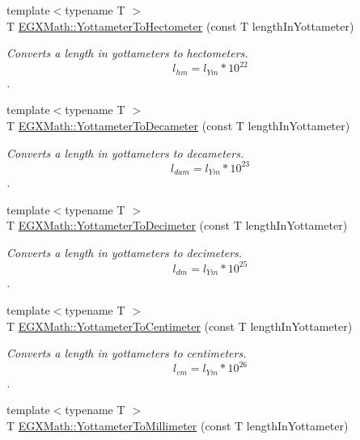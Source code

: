 \begin{DoxyCompactItemize}
{\footnotesize template$<$typename T $>$ }\\T \mbox{\hyperlink{group___e_g_x_math-_conversions-_length_conversions-_yottameter-_s_i_ga3c7aed6e299bc4f0288d0672a7262320}{E\+G\+X\+Math\+::\+Yottameter\+To\+Hectometer}} (const T length\+In\+Yottameter)
\begin{DoxyCompactList}\small\item\em Converts a length in yottameters to hectometers. \[ l_{hm}=l_{Ym} * 10^{22} \]. \end{DoxyCompactList}\item 
{\footnotesize template$<$typename T $>$ }\\T \mbox{\hyperlink{group___e_g_x_math-_conversions-_length_conversions-_yottameter-_s_i_gadb4ab7fb7c1091124160d66ace6439a3}{E\+G\+X\+Math\+::\+Yottameter\+To\+Decameter}} (const T length\+In\+Yottameter)
\begin{DoxyCompactList}\small\item\em Converts a length in yottameters to decameters. \[ l_{dam}=l_{Ym} * 10^{23} \]. \end{DoxyCompactList}\item 
{\footnotesize template$<$typename T $>$ }\\T \mbox{\hyperlink{group___e_g_x_math-_conversions-_length_conversions-_yottameter-_s_i_ga8d80b66500f1ccc85839ec50b0ca8b0d}{E\+G\+X\+Math\+::\+Yottameter\+To\+Decimeter}} (const T length\+In\+Yottameter)
\begin{DoxyCompactList}\small\item\em Converts a length in yottameters to decimeters. \[ l_{dm}=l_{Ym} * 10^{25} \]. \end{DoxyCompactList}\item 
{\footnotesize template$<$typename T $>$ }\\T \mbox{\hyperlink{group___e_g_x_math-_conversions-_length_conversions-_yottameter-_s_i_ga29b512ac5c39f960b5f705cfb9bfe226}{E\+G\+X\+Math\+::\+Yottameter\+To\+Centimeter}} (const T length\+In\+Yottameter)
\begin{DoxyCompactList}\small\item\em Converts a length in yottameters to centimeters. \[ l_{cm}=l_{Ym} * 10^{26} \]. \end{DoxyCompactList}\item 
{\footnotesize template$<$typename T $>$ }\\T \mbox{\hyperlink{group___e_g_x_math-_conversions-_length_conversions-_yottameter-_s_i_ga0e68b787003f09883a6b15b92b003a07}{E\+G\+X\+Math\+::\+Yottameter\+To\+Millimeter}} (const T length\+In\+Yottameter)

\end{DoxyCompactItemize}
